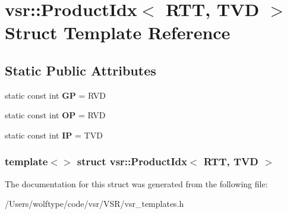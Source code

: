 \hypertarget{structvsr_1_1_product_idx_3_01_r_t_t_00_01_t_v_d_01_4}{\section{vsr\-:\-:Product\-Idx$<$ R\-T\-T, T\-V\-D $>$ Struct Template Reference}
\label{structvsr_1_1_product_idx_3_01_r_t_t_00_01_t_v_d_01_4}
}
\subsection*{Static Public Attributes}
\begin{DoxyCompactItemize}
\item 
\hypertarget{structvsr_1_1_product_idx_3_01_r_t_t_00_01_t_v_d_01_4_a68e167385e9181f081a8a3bcbce10125}{static const int {\bfseries G\-P} = R\-V\-D}\label{structvsr_1_1_product_idx_3_01_r_t_t_00_01_t_v_d_01_4_a68e167385e9181f081a8a3bcbce10125}

\item 
\hypertarget{structvsr_1_1_product_idx_3_01_r_t_t_00_01_t_v_d_01_4_ad55c308b40280cd2c1af8bfaa3b7fbc7}{static const int {\bfseries O\-P} = R\-V\-D}\label{structvsr_1_1_product_idx_3_01_r_t_t_00_01_t_v_d_01_4_ad55c308b40280cd2c1af8bfaa3b7fbc7}

\item 
\hypertarget{structvsr_1_1_product_idx_3_01_r_t_t_00_01_t_v_d_01_4_ac7ab2dea8cd1e089319eb0b64ff9cf64}{static const int {\bfseries I\-P} = T\-V\-D}\label{structvsr_1_1_product_idx_3_01_r_t_t_00_01_t_v_d_01_4_ac7ab2dea8cd1e089319eb0b64ff9cf64}

\end{DoxyCompactItemize}
\subsubsection*{template$<$$>$ struct vsr\-::\-Product\-Idx$<$ R\-T\-T, T\-V\-D $>$}



The documentation for this struct was generated from the following file\-:\begin{DoxyCompactItemize}
\item 
/\-Users/wolftype/code/vsr/\-V\-S\-R/vsr\-\_\-templates.\-h\end{DoxyCompactItemize}
